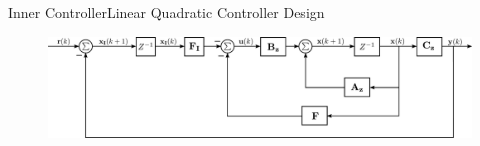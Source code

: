 \begin{frame}{Inner Controller}{Linear Quadratic Controller Design}

%
%  
%  
%  

{
      \begin{figure}[H]
        \includegraphics[width=1\textwidth]{figures/LQRblockDiagram2}
      \end{figure}
}



\end{frame}
